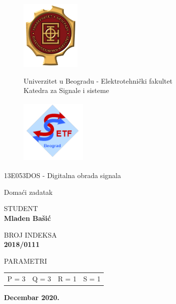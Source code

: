 

\thispagestyle{empty}
	
	\begin{figure}[ht]
			\includegraphics[width=2.9cm]{design/logo_ETF.png}
	   \endminipage
	   \begin{center}
	       \Large Univerzitet u Beogradu - Elektrotehnički fakultet \\ \Large Katedra za Signale i sisteme 
	   \end{center}
			
	   \endminipage
			\includegraphics[height = 3.2cm ,width=3.2cm]{design/logo_SIS.png}
		\endminipage
	\end{figure}
	
	\begin{center}
	\vspace{3.4cm}
	\LARGE
	13E053DOS - Digitalna obrada signala
	
	\vspace{0.8cm}
	\LARGE
	Domaći zadatak 
	
	
	\vspace{3cm}
	\normalsize	
	STUDENT \\
	\vspace{.3cm}
	\large
	\textbf{Mladen Bašić}
	
	\vspace{1.3cm}
	\normalsize	
	BROJ INDEKSA \\
	\vspace{.3cm}
	\large
	\textbf{2018/0111}
	
	\vspace{1.3cm}
	\normalsize	
	PARAMETRI \\
	\vspace{.3cm}
	\large
    \begin{tabular}{c c c c}
         P = 3& Q = 3& R = 1& S = 1 \\
    \end{tabular}	
	
    \vspace{3.5cm}
	\large
	\textbf{Decembar 2020.}
	\end{center}
	
	\newpage